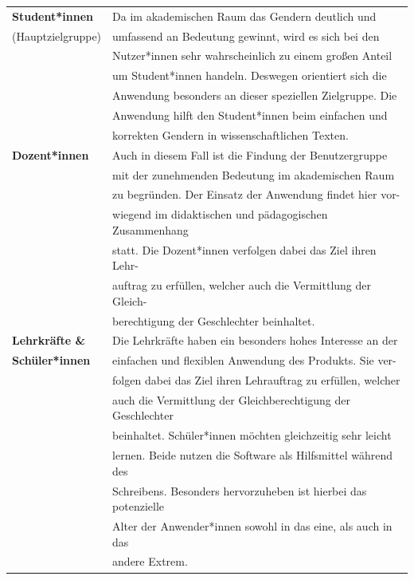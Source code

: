 \documentclass[paper=a4, parskip=half]{scrreprt}
\begin{document}
\begin{table}[!htb]
\begin{tabular}{ll}
\textbf{Student*innen} & Da im akademischen Raum das Gendern deutlich und \\ 
(Hauptzielgruppe) & umfassend an Bedeutung gewinnt, wird es sich bei den \\
& Nutzer*innen sehr wahrscheinlich zu einem großen Anteil\\ 
& um Student*innen handeln. Deswegen orientiert sich die \\
& Anwendung besonders an dieser speziellen Zielgruppe. Die \\
& Anwendung hilft den Student*innen beim einfachen und \\
& korrekten Gendern in wissenschaftlichen Texten. \vspace{0.15cm} \\

\textbf{Dozent*innen} & Auch in diesem Fall ist die Findung der Benutzergruppe \\
& mit der zunehmenden Bedeutung im akademischen Raum \\
& zu begründen. Der Einsatz der Anwendung findet hier vor- \\
& wiegend im didaktischen und pädagogischen Zusammenhang \\
& statt. Die Dozent*innen verfolgen dabei das Ziel ihren Lehr- \\
& auftrag zu erfüllen, welcher auch die Vermittlung der Gleich- \\
& berechtigung der Geschlechter beinhaltet. \vspace{0.15cm} \\

\textbf{Lehrkräfte \&} & Die Lehrkräfte haben ein besonders hohes Interesse an der \\
\textbf{Schüler*innen} & einfachen und flexiblen Anwendung des Produkts. Sie ver- \\
& folgen dabei das Ziel ihren Lehrauftrag zu erfüllen, welcher \\
& auch die Vermittlung der Gleichberechtigung der Geschlechter \\
& beinhaltet. Schüler*innen möchten gleichzeitig sehr leicht \\
& lernen. Beide nutzen die Software als Hilfsmittel während des \\
& Schreibens. Besonders hervorzuheben ist hierbei das potenzielle \\
& Alter der Anwender*innen sowohl in das eine, als auch in das \\
& andere Extrem. \vspace{0.15cm} \\


\end{tabular}
\end{table}
\end{document}
